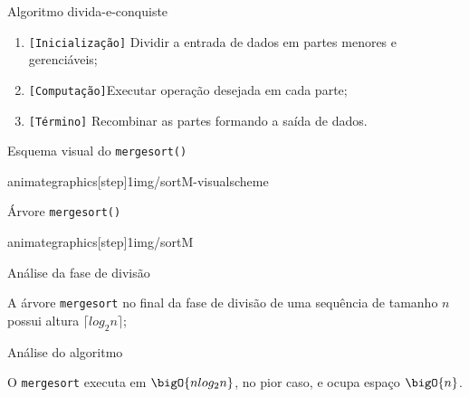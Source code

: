 
\begin{frame}{Algoritmo divida-e-conquiste}

\begin{enumerate}\itemsep16pt
\item<1->{ {\tt [Inicialização]} Dividir a entrada de
dados em partes menores e gerenciáveis;}

\item<2-> { {\tt [Computação]}Executar operação
desejada em cada parte;}

\item<3> {\tt [Término]} Recombinar as partes formando a saída de dados.
\end{enumerate}

\end{frame}

\begin{frame}{Esquema visual do {\tt mergesort()}}

\begin{center}
animategraphics[step]{1}{img/sortM-visualscheme}{}{}
\end{center}

\end{frame}

\begin{frame}{Árvore {\tt mergesort()}}

animategraphics[step]{1}{img/sortM}{}{}

\end{frame}

\begin{frame}{Análise da fase de \alert{divisão}}

\begin{teorema}
A árvore {\tt mergesort} no final da fase de divisão de uma sequência
de tamanho $n$ possui altura $\lceil log_2n\rceil$;
\end{teorema}

\end{frame}

\begin{frame}{Análise do algoritmo}

\begin{teorema}
O {\tt mergesort} executa em $\bigO{nlog_2n}$, no pior caso, e ocupa
espaço $\bigO{n}$. 
\end{teorema}

\end{frame}


